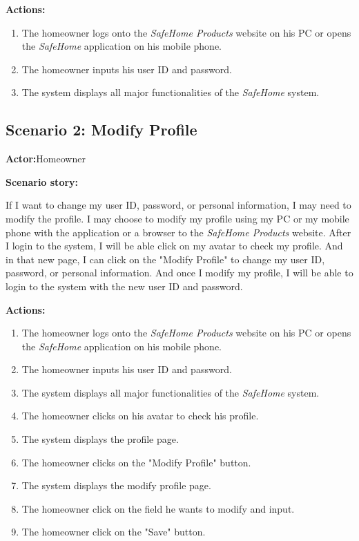 \documentclass[twoside,11pt]{article}
\begin{document}
\textbf{Actions:}

\begin{enumerate}
    \item The homeowner logs onto the \emph{SafeHome Products} website on his PC or opens the \emph{SafeHome} application on his mobile phone.
    \item The homeowner inputs his user ID and password.
    \item The system displays all major functionalities of the \emph{SafeHome} system.
\end{enumerate}


\subsection{Scenario 2: Modify Profile}

\textbf{Actor:}Homeowner

\textbf{Scenario story:}

If I want to change my user ID, password, or personal information, I may need to modify the profile. I may choose to modify my profile using my PC or my mobile phone with the application or a browser to the \emph{SafeHome Products} website. After I login to the system, I will be able click on my avatar to check my profile. And in that new page, I can click on the "Modify Profile" to change my user ID, password, or personal information. And once I modify my profile, I will be able to login to the system with the new user ID and password.

\textbf{Actions:}

\begin{enumerate}
    \item The homeowner logs onto the \emph{SafeHome Products} website on his PC or opens the \emph{SafeHome} application on his mobile phone.
    \item The homeowner inputs his user ID and password.
    \item The system displays all major functionalities of the \emph{SafeHome} system.
    \item The homeowner clicks on his avatar to check his profile.
    \item The system displays the profile page.
    \item The homeowner clicks on the "Modify Profile" button.
    \item The system displays the modify profile page.
    \item The homeowner click on the field he wants to modify and input.
    \item The homeowner click on the "Save" button.
\end{enumerate}
\end{document}

